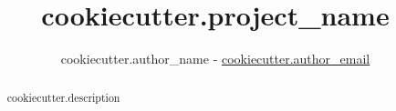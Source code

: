 \documentclass[10pt, oneside]{article}
\title{ {{ cookiecutter.project_name }} }
\author{ {{ cookiecutter.author_name }} - \href{mailto:{{ cookiecutter.author_email }}}{ {{ cookiecutter.author_email }} } }
\begin{document}
\sloppy
\maketitle

\begin{abstract}
    {{ cookiecutter.description }}
\end{abstract}

\tableofcontents
\end{document}
